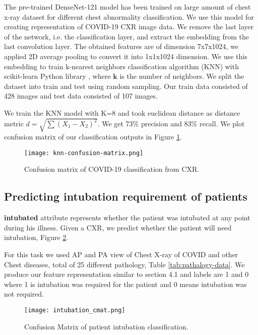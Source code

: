 \documentclass[a4paper]{article}
\begin{document}
The pre-trained DenseNet-121 model has been trained on large amount of chest x-ray dataset for different chest abnormality classification. We use this model for creating representation of COVID-19 CXR image data. We remove the last layer of the network, i.e. the classification layer, and extract the embedding from the last convolution layer. The obtained features are of dimension 7x7x1024, we applied 2D average pooling to convert it into 1x1x1024 dimension.
We use this embedding to train k-nearest neighbors classification algorithm (KNN) with scikit-learn Python library \cite{scikit-learn}, where $\boldsymbol{k}$ is the number of neighbors. We split the dataset into train and test using random sampling. Our train data consisted of 428 images and test data consisted of 107 images.

We train the KNN model with K=8 and took euclidean distance as distance metric $d = \sqrt{\sum(X_1 - X_2)^2}$.
We get 73\% precision and 83\% recall. We plot confusion matrix of our classification outputs in Figure \ref{fig:knn-cmat}.


\begin{figure}[h]
\centering
\texttt{[image: knn-confusion-matrix.png]}
\caption{\label{fig:knn-cmat}Confusion matrix of COVID-19 classification from CXR.}
\end{figure}


\subsection{Predicting intubation requirement of patients}

\cite{cohen2020covid} \textbf{intubated} attribute represents whether the patient was intubated at any point during his illness. Given a CXR, we predict whether the patient will need intubation, Figure \ref{fig:intub-cmat}.

For this task we used AP and PA view of Chest X-ray of COVID and other Chest diseases, total of 25 different pathology, Table \ref{tab:pathalogy-data}.
We produce our feature representation similar to section 4.1 and labels are 1 and 0 where 1 is intubation was required for the patient and 0 means intubation was not required.

\begin{figure}[h]
\centering
\texttt{[image: intubation\_cmat.png]}
\caption{\label{fig:intub-cmat}Confusion Matrix of patient intubation classification.}
\end{figure}
\end{document}
